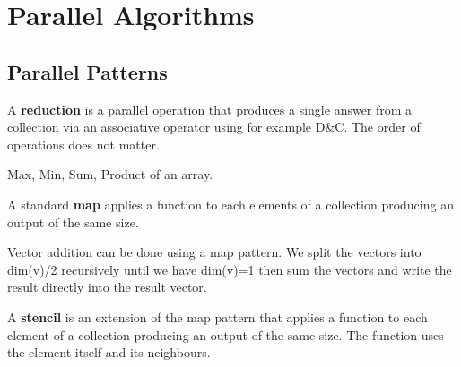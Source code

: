 \section{Parallel Algorithms}

\subsection{Parallel Patterns}

\begin{definition}

                A \textbf{reduction} is a parallel operation that produces a single answer from a collection via an
                associative operator using for example D\&C. The order
                of operations does not matter.
            
\end{definition}

\begin{example}

                Max, Min, Sum, Product of an array.
            
\end{example}

\begin{definition}

                A standard \textbf{map} applies a function to each elements of a collection producing an output of the
                same size.
            
\end{definition}

\begin{example}

                Vector addition can be done using a map pattern. We split the vectors into dim(v)/2 recursively
                until we
                have dim(v)=1 then sum the vectors and write the result directly into the result vector.
            
\end{example}

\begin{definition}

                A \textbf{stencil} is an extension of the map pattern that applies a function to each element of a
                collection producing an output of the same size. The function uses the element itself and its
                neighbours.
            
\end{definition}

